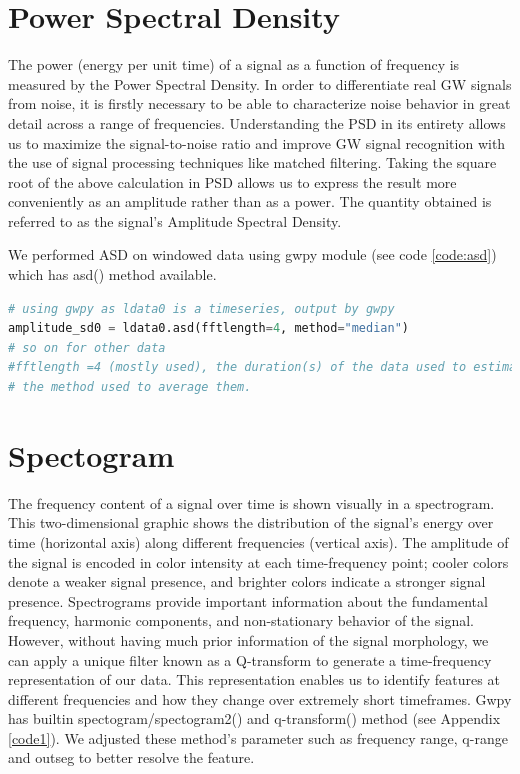 \section{Power Spectral Density}
The power (energy per unit time) of a signal as a function of frequency is measured by the Power Spectral Density.
In order to differentiate real GW signals from noise, it is firstly necessary to be able to characterize noise behavior in great detail across a range of frequencies. Understanding the PSD in its entirety allows us to maximize the signal-to-noise ratio and improve GW signal recognition with the use of signal processing techniques like matched filtering.
Taking the square root of the above calculation in PSD allows us to express the result more conveniently as an amplitude rather than as a power. The quantity obtained is referred to as the signal's Amplitude Spectral Density. 

We performed ASD on windowed data using gwpy module (see code \ref{code:asd}) which has asd() method \cite{gwpy} available.
\begin{lstlisting}[language=Python, caption=Amplitude Spectral Density using gwpy, label=code:asd]
# using gwpy as ldata0 is a timeseries, output by gwpy
amplitude_sd0 = ldata0.asd(fftlength=4, method="median")
# so on for other data
#fftlength =4 (mostly used), the duration(s) of the data used to estimate each FFT
# the method used to average them. 
\end{lstlisting}
\section{Spectogram}
The frequency content of a signal over time is shown visually in a spectrogram. This two-dimensional graphic shows the distribution of the signal's energy over time (horizontal axis) along different frequencies (vertical axis). The amplitude of the signal is encoded in color intensity at each time-frequency point; cooler colors denote a weaker signal presence, and brighter colors indicate a stronger signal presence. Spectrograms provide important information about the fundamental frequency, harmonic components, and non-stationary behavior of the signal.
However, without having much prior information of the signal morphology, we can apply a unique filter known as a Q-transform to generate a time-frequency representation of our data. This representation enables us to identify features at different frequencies and how they change over extremely short timeframes. Gwpy has builtin spectogram/spectogram2() and q-transform() method (see Appendix \ref{code1}). We adjusted these method's parameter such as frequency range, q-range and outseg to better resolve the feature.

